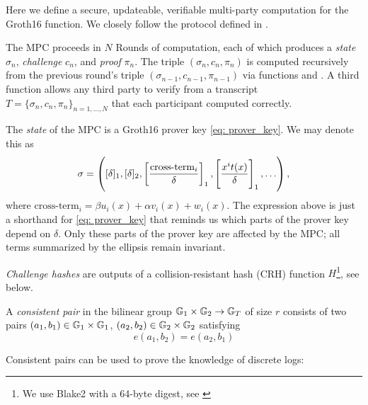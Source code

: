 \label{sec: mpc_def}

Here we define a secure, updateable, verifiable multi-party computation for the Groth16 \Setup{} function. We closely follow the protocol defined in \cite{bowe19}.

The MPC proceeds in $N$ Rounds of computation, each of which produces a \emph{state} $\sigma_n$, \emph{challenge} $c_n$, and \emph{proof} $\pi_n$. The triple $(\sigma_n, c_n, \pi_n)$ is computed recursively from the previous round's triple $(\sigma_{n-1}, c_{n-1}, \pi_{n-1})$ via functions \contribute{} and \challenge{}. A third function \verify{} allows any third party to verify from a transcript $T = \{ \sigma_n, c_n, \pi_n \}_{n=1,\ldots, N}$ that each participant computed \contribute{} correctly. 

\begin{definition}[State]
    The \emph{state} of the MPC is a Groth16 prover key \eqref{eq: prover_key}. We may denote this as 
    \begin{equation}\label{eq: short sigma} \sigma = \left( [\delta]_1, [\delta]_2, \left[\frac{\text{cross-term}_i }{\delta}\right]_1, \left[ \frac{x^i t(x)}{\delta} \right]_1{}{}, \ldots \right), \end{equation} where $\textrm{cross-term}_i = \beta u_i(x) + \alpha v_i(x) + w_i(x)$. 
    The expression above is just a shorthand for \eqref{eq: prover_key} that reminds us which parts of the prover key depend on $\delta$. Only these parts of the prover key are affected by the MPC; all terms summarized by the ellipsis remain invariant.
\end{definition}

\begin{definition}
    \emph{Challenge hashes} are outputs of a collision-resistant hash (CRH) function $H$\footnote{We use Blake2 with a 64-byte digest, see \cite{blake2}}, see \challenge{} below.
\end{definition}

\begin{definition}
    A \emph{consistent pair} in the bilinear group $\mathbb{G}_1 \times \mathbb{G}_2 \to \mathbb{G}_T$ of size $r$ consists of two pairs $(a_1, b_1) \in \mathbb{G}_1 \times \mathbb{G}_1 $, $(a_2, b_2) \in \mathbb{G}_2 \times \mathbb{G}_2$ satisfying 
    \begin{equation}\label{eq: ratio}
        e\left( a_1, b_2 \right) = e\left( a_2, b_1\right)
    \end{equation}
\end{definition}
Consistent pairs can be used to prove the knowledge of discrete logs:

